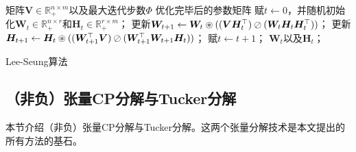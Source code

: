 \begin{algorithm}[t]
	\begin{algorithmic}[1]
	\REQUIRE 矩阵$\boldsymbol{V}\in\mathbb{R}_{+}^{n\times m}$以及最大迭代步数$\Phi$
	\ENSURE 优化完毕后的参数矩阵
	\STATE 赋$t\leftarrow 0$，并随机初始化$\boldsymbol{W}_{t}\in\mathbb{R}_{+}^{n\times r}$和$\boldsymbol{H}_{t}\in\mathbb{R}_{+}^{r\times m}$；
    \STATE 更新$\boldsymbol{W}_{t+1}\leftarrow\boldsymbol{W}_{t}\oast(({\boldsymbol{V}\boldsymbol{H}_{t}^{\top}})\oslash({\boldsymbol{W}_{t}\boldsymbol{H}_{t}\boldsymbol{H}_{t}^{\top}}))$；
    \STATE 更新$\boldsymbol{H}_{t+1}\leftarrow\boldsymbol{H}_{t}\oast(({\boldsymbol{W}_{t+1}^{\top}\boldsymbol{V}})\oslash({\boldsymbol{W}_{t+1}^{\top}\boldsymbol{W}_{t+1}\boldsymbol{H}_{t}}))$；
	\STATE 赋$t\leftarrow t+1$；
	\ENDWHILE
	\RETURN $\boldsymbol{W}_{t}$以及$\boldsymbol{H}_{t}$；
	\end{algorithmic}
	\captionsetup{labelsep=period,font=bf}
	\caption{Lee-Seung算法}
	\label{alg:leeseung}
\end{algorithm}

\subsection{（非负）张量CP分解与Tucker分解}\label{sec:tensor-decomp}
本节介绍（非负）张量CP分解与Tucker分解。这两个张量分解技术是本文提出的所有方法的基石。

